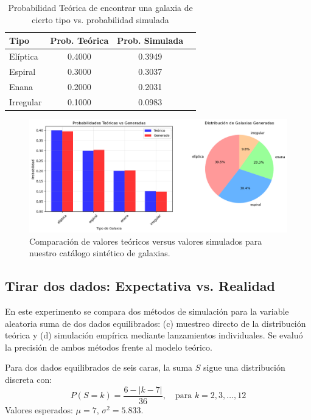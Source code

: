 \documentclass[baaa]{baaa}
\begin{document}
\begin{table}[h]
    \centering
    \small
    \caption{Probabilidad Teórica de encontrar una galaxia de cierto tipo vs. probabilidad simulada}
    \begin{tabular}{lccc}
        \toprule
        Tipo & Prob. Teórica & Prob. Simulada \\
        \midrule
        Elíptica & 0.4000 & 0.3949  \\
        Espiral & 0.3000 & 0.3037 \\
        Enana & 0.2000 & 0.2031 \\
        Irregular & 0.1000 & 0.0983 \\
        \bottomrule
    \end{tabular}
    \label{galax}
    \vspace{0.5em}
\end{table}

\begin{figure}[!h]
    \centering
    \includegraphics[width=1\linewidth]{imagenes/galaxias.png}
    \caption{Comparación de valores teóricos versus valores simulados para nuestro catálogo sintético de galaxias.}
    \label{galaxias}
\end{figure}

\subsection{Tirar dos dados: Expectativa vs. Realidad}

En este experimento se compara dos métodos de simulación para la variable aleatoria suma de dos dados equilibrados: (c) muestreo directo de la distribución teórica y (d) simulación empírica mediante lanzamientos individuales. Se evaluó la precisión de ambos métodos frente al modelo teórico.

Para dos dados equilibrados de seis caras, la suma \(S\) sigue una distribución discreta con:
\[
P(S = k) = \frac{6 - |k - 7|}{36}, \quad \text{para } k = 2, 3, \dots, 12
\]
Valores esperados: \(\mu = 7\), \(\sigma^2 = 5.833\).
\end{document}
